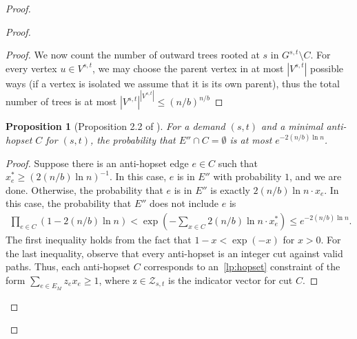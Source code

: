 \documentclass{article}
\newtheorem{proposition}[theorem]{Proposition}
\theoremstyle{definition}
\theoremstyle{remark}
\begin{document}
\begin{proof}
\begin{proof}
\begin{proof}
            We now count the number of outward trees rooted at $s$ in $G^{s,t} \setminus C$. For every vertex $u \in V^{s,t}$, we may choose the parent vertex in at most $|V^{s,t}|$ possible ways (if a vertex is isolated we assume that it is its own parent), thus the total number of trees is at most $|V^{s,t}|^{|V^{s,t}|} \leq (n / b)^{n/b}$
        \end{proof}

        \begin{proposition}[Proposition 2.2 of \cite{BBMRY11}] \label{prop:thin2}
            For a demand $(s,t)$ and a minimal anti-hopset $C$ for $(s,t)$, the probability that $E'' \cap C = \emptyset$ is at most $e^{-2(n/b)\ln{n}}$.
        \end{proposition}
        \begin{proof}
            Suppose there is an anti-hopset edge $e \in C$ such that $x_e^* \geq (2(n/b)\ln{n})^{-1}$. In this case, $e$ is in $E''$ with probability $1$, and we are done. Otherwise, the probability that $e$ is in $E''$ is exactly $2(n/b)\ln{n} \cdot x_e$. In this case, the probability that $E''$ does not include $e$ is 
            \begin{align*}
                \prod_{e \in C} \left( 1 - 2 (n/b) \ln{n} \right) < \exp{\left(-\sum_{x \in C} 2 (n/b) \ln{n} \cdot x^*_e \right)} \leq e^{-2 (n/b) \ln{n}}.
            \end{align*}
            The first inequality holds from the fact that $1-x < \exp{(-x)}$ for $x > 0$. For the  last inequality, observe that every anti-hopset is an integer cut against valid paths. Thus, each anti-hopset $C$ corresponds to an~\ref{lp:hopset} constraint of the form $\sum_{e \in E_M} z_e x_e \geq 1$, where $\bm{\mathrm{z}} \in \mathcal{Z}_{s,t}$ is the indicator vector for cut $C$.
        \end{proof}
        

\end{proof}
\end{proof}
\end{document}
